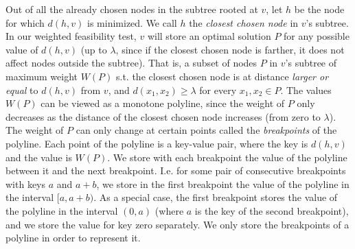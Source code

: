 \documentclass[a4paper,UKenglish]{lipics-v2016}
\theoremstyle{plain}
\begin{document}
Out of all the already chosen nodes in the subtree rooted at $v$, let $h$ be the node for which $d(h,v)$ is minimized. We call $h$ the {\em closest chosen node} in $v$'s subtree. In our weighted feasibility test, $v$ will store an optimal solution $P$ for any possible value of $d(h,v)$ (up to $\lambda$, since if the closest chosen node is farther, it does not affect nodes outside the subtree). That is, a subset of nodes $P$ in $v$'s subtree of maximum weight $W(P)$ s.t. the closest chosen node is at distance {\em larger or equal} to $d(h,v)$ from $v$, and $d(x_1,x_2) \geq \lambda$ for every  $x_1,x_2\in P$. 
The values $W(P)$ can be viewed as a monotone polyline, since the weight of $P$ only decreases as the distance of the closest chosen node increases (from zero to $\lambda$). The weight of $P$ can only change at certain points called the {\em breakpoints} of the polyline. Each point of the polyline is a key-value pair, where the key is $d(h,v)$ and the value is $W(P)$. We store with each breakpoint the value of the polyline between it and the next breakpoint. I.e. for some pair of consecutive breakpoints with keys $a$ and $a+b$, we store in the first breakpoint the value of the polyline in the interval $[a,a+b)$. As a special case, the first breakpoint stores the value of the polyline in the interval $(0,a)$ (where $a$ is the key of the second breakpoint), and we store the value for key zero separately. We only store the breakpoints of a polyline in order to represent it.
\end{document}
